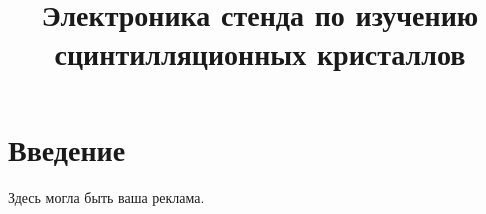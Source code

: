 \documentclass[a4paper, 42pt]{article}
\title{Электроника стенда по изучению сцинтилляционных кристаллов}
\begin{document}
\maketitle
\newpage

\section{Введение}
Здесь могла быть ваша реклама.
\end{document}
